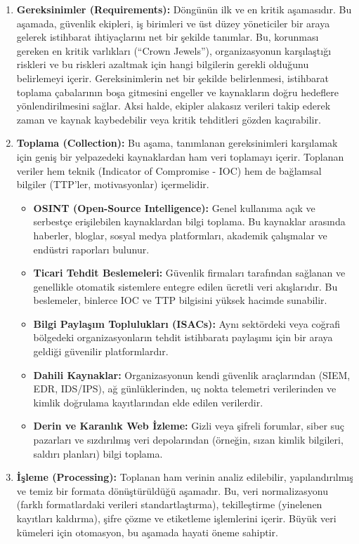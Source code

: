 \begin{enumerate}
    \item \textbf{Gereksinimler (Requirements):} Döngünün ilk ve en kritik aşamasıdır. Bu aşamada, güvenlik ekipleri, iş birimleri ve üst düzey yöneticiler bir araya gelerek istihbarat ihtiyaçlarını net bir şekilde tanımlar. Bu, korunması gereken en kritik varlıkları (“Crown Jewels”), organizasyonun karşılaştığı riskleri ve bu riskleri azaltmak için hangi bilgilerin gerekli olduğunu belirlemeyi içerir. Gereksinimlerin net bir şekilde belirlenmesi, istihbarat toplama çabalarının boşa gitmesini engeller ve kaynakların doğru hedeflere yönlendirilmesini sağlar. Aksi halde, ekipler alakasız verileri takip ederek zaman ve kaynak kaybedebilir veya kritik tehditleri gözden kaçırabilir.
    \item \textbf{Toplama (Collection):} Bu aşama, tanımlanan gereksinimleri karşılamak için geniş bir yelpazedeki kaynaklardan ham veri toplamayı içerir. Toplanan veriler hem teknik (Indicator of Compromise - IOC) hem de bağlamsal bilgiler (TTP’ler, motivasyonlar) içermelidir.
    \begin{itemize}
        \item \textbf{OSINT (Open-Source Intelligence):} Genel kullanıma açık ve serbestçe erişilebilen kaynaklardan bilgi toplama. Bu kaynaklar arasında haberler, bloglar, sosyal medya platformları, akademik çalışmalar ve endüstri raporları bulunur.
        \item \textbf{Ticari Tehdit Beslemeleri:} Güvenlik firmaları tarafından sağlanan ve genellikle otomatik sistemlere entegre edilen ücretli veri akışlarıdır. Bu beslemeler, binlerce IOC ve TTP bilgisini yüksek hacimde sunabilir.
        \item \textbf{Bilgi Paylaşım Toplulukları (ISACs):} Aynı sektördeki veya coğrafi bölgedeki organizasyonların tehdit istihbaratı paylaşımı için bir araya geldiği güvenilir platformlardır.
        \item \textbf{Dahili Kaynaklar:} Organizasyonun kendi güvenlik araçlarından (SIEM, EDR, IDS/IPS), ağ günlüklerinden, uç nokta telemetri verilerinden ve kimlik doğrulama kayıtlarından elde edilen verilerdir.
        \item \textbf{Derin ve Karanlık Web İzleme:} Gizli veya şifreli forumlar, siber suç pazarları ve sızdırılmış veri depolarından (örneğin, sızan kimlik bilgileri, saldırı planları) bilgi toplama.
    \end{itemize}
    \item \textbf{İşleme (Processing):} Toplanan ham verinin analiz edilebilir, yapılandırılmış ve temiz bir formata dönüştürüldüğü aşamadır. Bu, veri normalizasyonu (farklı formatlardaki verileri standartlaştırma), tekilleştirme (yinelenen kayıtları kaldırma), şifre çözme ve etiketleme işlemlerini içerir. Büyük veri kümeleri için otomasyon, bu aşamada hayati öneme sahiptir.

\end{enumerate}
